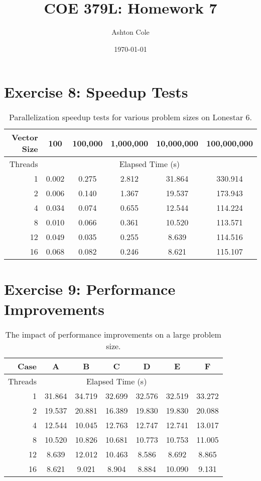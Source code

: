 \documentclass{article}
\title{COE 379L: Homework 7}
\author{Ashton Cole}
\date{\today}
\begin{document}
\maketitle

\section{Exercise 8: Speedup Tests}

\begin{table}[h!]
	\centering
	\caption{Parallelization speedup tests for various problem sizes on Lonestar 6.}
	\label{tbl:speedup}
	\begin{tabular}{r|ccccc}
		Vector Size & 100 & 100,000 & 1,000,000 & 10,000,000 & 100,000,000 \\
		\hline
		Threads & \multicolumn{5}{c}{Elapsed Time (s)} \\
		\hline
		1 & 0.002 & 0.275 & 2.812 & 31.864 & 330.914 \\
		2 & 0.006 & 0.140 & 1.367 & 19.537 & 173.943 \\
		4 & 0.034 & 0.074 & 0.655 & 12.544 & 114.224 \\
		8 & 0.010 & 0.066 & 0.361 & 10.520 & 113.571 \\
		12 & 0.049 & 0.035 & 0.255 & 8.639 & 114.516 \\
		16 & 0.068 & 0.082 & 0.246 & 8.621 & 115.107
	\end{tabular}
\end{table}

\section{Exercise 9: Performance Improvements}

\begin{table}[h!]
	\centering
	\caption{The impact of performance improvements on a large problem size.}
	\label{tbl:speedup}
	\begin{tabular}{r|cccccc}
		Case & A & B & C & D & E & F \\
		\hline
		Threads & \multicolumn{5}{c}{Elapsed Time (s)} \\
		\hline
		1 & 31.864 & 34.719 & 32.699 & 32.576 & 32.519 & 33.272 \\
		2 & 19.537 & 20.881 & 16.389 & 19.830 & 19.830 & 20.088 \\
		4 & 12.544 & 10.045 & 12.763 & 12.747 & 12.741 & 13.017 \\
		8 & 10.520 & 10.826 & 10.681 & 10.773 & 10.753 & 11.005 \\
		12 & 8.639 & 12.012 & 10.463 & 8.586 & 8.692 & 8.865 \\
		16 & 8.621 & 9.021 & 8.904 & 8.884 & 10.090 & 9.131
	\end{tabular}
\end{table}
\end{document}
